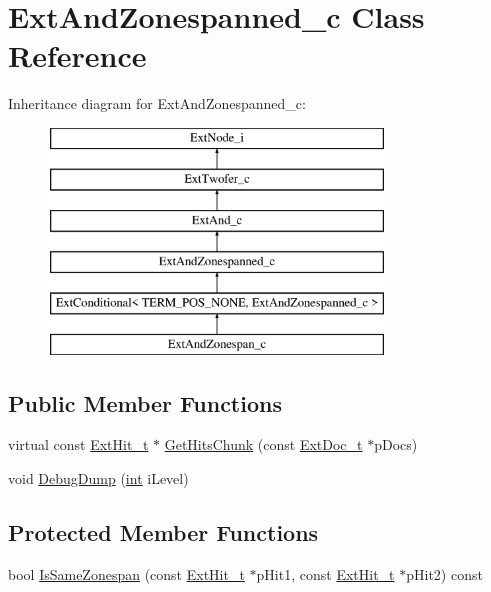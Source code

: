 \hypertarget{classExtAndZonespanned__c}{\section{Ext\-And\-Zonespanned\-\_\-c Class Reference}
\label{classExtAndZonespanned__c}
}
Inheritance diagram for Ext\-And\-Zonespanned\-\_\-c\-:\begin{figure}[H]
\begin{center}
\leavevmode
\includegraphics[height=6.000000cm]{classExtAndZonespanned__c}
\end{center}
\end{figure}
\subsection*{Public Member Functions}
\begin{DoxyCompactItemize}
\item 
virtual const \hyperlink{structExtHit__t}{Ext\-Hit\-\_\-t} $\ast$ \hyperlink{classExtAndZonespanned__c_a639edc3e510875b1c9c2bc8a970f6241}{Get\-Hits\-Chunk} (const \hyperlink{structExtDoc__t}{Ext\-Doc\-\_\-t} $\ast$p\-Docs)
\item 
void \hyperlink{classExtAndZonespanned__c_a6cd432ccca91fc775b0d7d972f063232}{Debug\-Dump} (\hyperlink{sphinxexpr_8cpp_a4a26e8f9cb8b736e0c4cbf4d16de985e}{int} i\-Level)
\end{DoxyCompactItemize}
\subsection*{Protected Member Functions}
\begin{DoxyCompactItemize}
\item 
bool \hyperlink{classExtAndZonespanned__c_a9a1b82a99f142c48f05eb569951eb338}{Is\-Same\-Zonespan} (const \hyperlink{structExtHit__t}{Ext\-Hit\-\_\-t} $\ast$p\-Hit1, const \hyperlink{structExtHit__t}{Ext\-Hit\-\_\-t} $\ast$p\-Hit2) const 
\end{DoxyCompactItemize}

